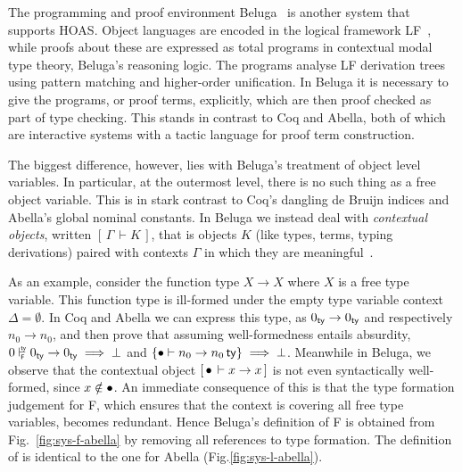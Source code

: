 \newcommand{\tax}{\textsf{t\_ax}}
\newcommand{\tpi}{\textsf{t\_pi}~}
\newcommand{\tlam}{\textsf{t\_lam}~}
\newcommand{\tapp}{\textsf{t\_app}~}
\newcommand{\ptc}{\textsf{p\_tc}}

\newcommand{\rall}{\textsf{r\_all}}
\newcommand{\rarr}{\textsf{r\_arr}}
\newcommand{\rapp}{\textsf{r\_app}}
\newcommand{\rtapp}{\textsf{r\_App}}
\newcommand{\rlam}{\textsf{r\_lam}}
\newcommand{\rtlam}{\textsf{r\_Lam}}

\newcommand{\D}{\mathcal{D}}

\newcommand{\bc}[2]{\ensuremath{[\,#1\,\vdash #2\,]}}

The programming and proof environment Beluga~\cite{Pientka:FLOPS10,Pientka:CADE15} is another system that supports HOAS.
Object languages are encoded in the logical framework LF~\cite{Harper93jacm}, while proofs about these are expressed as total programs in contextual modal type theory, Beluga's reasoning logic.
The programs analyse LF derivation trees using pattern matching and higher-order unification.
In Beluga it is necessary to give the programs, or proof terms, explicitly, which are then proof checked as part of type checking.
This stands in contrast to Coq and Abella, both of which are interactive systems with a tactic language for proof term construction.

The biggest difference, however, lies with Beluga's treatment of object level variables.
In particular, at the outermost level, there is no such thing as a free object variable.
This is in stark contrast to Coq's dangling de Bruijn indices and Abella's global nominal constants.
In Beluga we instead deal with \emph{contextual objects}, written $\bc{\Gamma}{K}$, that is objects $K$ (like types, terms, typing derivations) paired with contexts $\Gamma$ in which they are meaningful~\cite{Nanevski:ICML05,Pientka:POPL08}.

As an example, consider the function type $X \to X$ where $X$ is a free type variable.
This function type is ill-formed under the empty type variable context $\Delta = \emptyset$.
In Coq and Abella we can express this type, as $0_{\mathsf{ty}} \to 0_{\mathsf{ty}}$ and respectively $n_0 \to n_0$, and then prove that assuming well-formedness entails absurdity, $\istyF{0}{0_\ty \to 0_\ty} \implies \bot$ and $\{\bullet \vdash n_0 \to n_0\,\mathsf{ty}\} \implies \bot$.
Meanwhile in Beluga, we observe that the contextual object $\bc{\emptyctx}{x \to x}$ is not even syntactically well-formed, since $x \notin \bullet$.
An immediate consequence of this is that the type formation judgement for F, which ensures that the context is covering all free type variables, becomes redundant.
Hence Beluga's definition of F is obtained from Fig.~\ref{fig:sys-f-abella} by removing all references to type formation.
The definition of \SysL is identical to the one for Abella (Fig.\ref{fig:sys-l-abella}).

